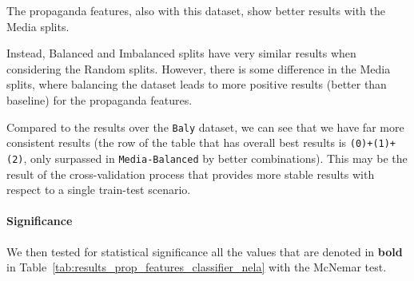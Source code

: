 The propaganda features, also with this dataset, show better results with the Media splits.

Instead, Balanced and Imbalanced splits have very similar results when considering the Random splits. However, there is some difference in the Media splits, where balancing the dataset leads to more positive results (better than baseline) for the propaganda features.

Compared to the results over the \texttt{Baly} dataset, we can see that we have far more consistent results (the row of the table that has overall best results is \texttt{(0)+(1)+(2)}, only surpassed in \texttt{Media-Balanced} by better combinations).
This may be the result of the cross-validation process that provides more stable results with respect to a single train-test scenario. 

\paragraph{Significance}
We then tested for statistical significance all the values that are denoted in \textbf{bold} in Table~\ref{tab:results_prop_features_classifier_nela} with the McNemar test.

\begin{table}[!htbp]
    \centering
    \caption{p-values of features set that have improvements in NELA dataset}
    \label{tab:pvalues_nela_classifier}
\end{table}

